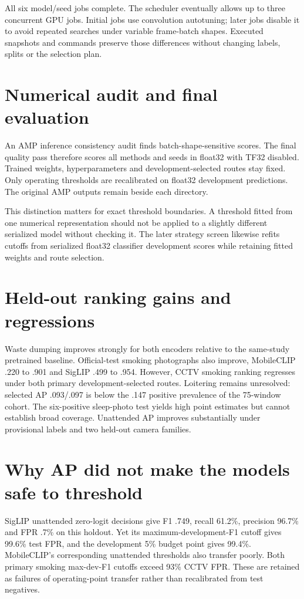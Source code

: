 All six model/seed jobs complete. The scheduler eventually allows up to three concurrent GPU jobs. Initial jobs use convolution autotuning; later jobs disable it to avoid repeated searches under variable frame-batch shapes. Executed snapshots and commands preserve those differences without changing labels, splits or the selection plan.

\section{Numerical audit and final evaluation}
An AMP inference consistency audit finds batch-shape-sensitive scores. The final quality pass therefore scores all methods and seeds in float32 with TF32 disabled. Trained weights, hyperparameters and development-selected routes stay fixed. Only operating thresholds are recalibrated on float32 development predictions. The original AMP outputs remain beside each  directory.

This distinction matters for exact threshold boundaries. A threshold fitted from one numerical representation should not be applied to a slightly different serialized model without checking it. The later strategy screen likewise refits cutoffs from serialized float32 classifier development scores while retaining fitted weights and route selection.

\section{Held-out ranking gains and regressions}

Waste dumping improves strongly for both encoders relative to the same-study pretrained baseline. Official-test smoking photographs also improve, MobileCLIP .220 to .901 and SigLIP .499 to .954. However, CCTV smoking ranking regresses under both primary development-selected routes. Loitering remains unresolved: selected AP .093/.097 is below the .147 positive prevalence of the 75-window cohort. The six-positive sleep-photo test yields high point estimates but cannot establish broad coverage. Unattended AP improves substantially under provisional labels and two held-out camera families.

\section{Why AP did not make the models safe to threshold}

SigLIP unattended zero-logit decisions give F1 .749, recall 61.2\%, precision 96.7\% and FPR .7\% on this holdout. Yet its maximum-development-F1 cutoff gives 99.6\% test FPR, and the development 5\% budget point gives 99.4\%. MobileCLIP's corresponding unattended thresholds also transfer poorly. Both primary smoking max-dev-F1 cutoffs exceed 93\% CCTV FPR. These are retained as failures of operating-point transfer rather than recalibrated from test negatives.

